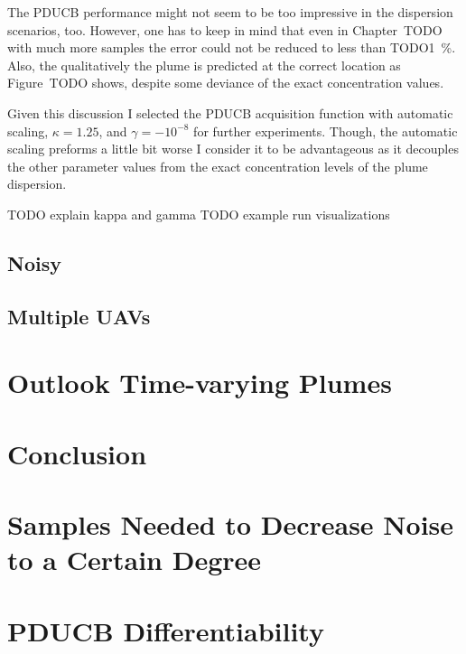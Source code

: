 \documentclass[11pt,a4paper,twoside,BCOR=15mm]{scrreprt}
\begin{document}
The PDUCB performance might not seem to be too impressive in the dispersion 
scenarios, too. However, one has to keep in mind that even in Chapter~TODO with 
much more samples the error could not be reduced to less than 
TODO\SI{1}{\percent}.  Also, the qualitatively the plume is predicted at the 
correct location as Figure~TODO shows, despite some deviance of the exact 
concentration values.

Given this discussion I selected the PDUCB acquisition function with automatic 
scaling, $\kappa = 1.25$, and $\gamma = -10^{-8}$ for further experiments.  
Though, the automatic scaling preforms a little bit worse I consider it to be 
advantageous as it decouples the other parameter values from the exact 
concentration levels of the plume dispersion.

TODO explain kappa and gamma
TODO example run visualizations

\section{Noisy}

\section{Multiple UAVs}

\chapter{Outlook Time-varying Plumes}

\chapter{Conclusion}

\appendix
\chapter{Samples Needed to Decrease Noise to a Certain Degree} 
\label{sec:decnoise}

\chapter{PDUCB Differentiability}

\printbibliography{}
\end{document}
